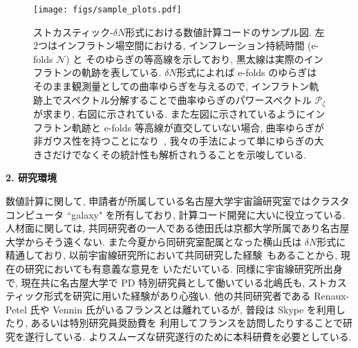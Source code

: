 \documentclass[11pt,a4j,dvipdfmx]{jarticle} 					%
\newcommand{\研究課題名}{\mgfamily\sffamily ストカスティック形式で迫る重力と量子論}
\newcommand{\研究機関名}{\mgfamily\sffamily 名古屋大学}
\newcommand{\研究代表者氏名}{\mgfamily\sffamily 多田祐一郎}
\newcommand{\研究期間の最終元号年度}{34}  %
\begin{document}
\begin{figure}[htbp]
	\centering
	\texttt{[image: figs/sample\_plots.pdf]}
	\caption{ストカスティック-$\delta N$形式における数値計算コードのサンプル図. 左2つはインフラトン場空間における, インフレーション持続時間 (e-folds $\mathcal{N}$) と
	そのゆらぎの等高線を示しており, 黒太線は実際のインフラトンの軌跡を表している. $\delta N$形式によれば e-folds のゆらぎはそのまま観測量としての曲率ゆらぎを与えるので,
	インフラトン軌跡上でスペクトル分解することで曲率ゆらぎのパワースペクトル $\mathcal{P}_\zeta$ が求まり, 右図に示されている.
	また左図に示されているようにインフラトン軌跡と e-folds 等高線が直交していない場合, 曲率ゆらぎが非ガウス性を持つことになり~\cite{Tada:2016pmk}, 
	我々の手法によって単にゆらぎの大きさだけでなくその統計性も解析されうることを示唆している.}
	\label{fig: StocDeltaN}
\end{figure}

\newpage

\begin{mdframed}[roundcorner=0.5zw,
	innertopmargin=0.8zw,innerbottommargin=0.8zw,
	linecolor=black!50,linewidth=0.2zw,
	backgroundcolor=black!10]
	{\bfseries\gtfamily\sffamily\large 2. 研究環境}
\end{mdframed}

数値計算に関して, 申請者が所属している名古屋大学宇宙論研究室ではクラスタコンピュータ ``galaxy" を所有しており, 計算コード開発に大いに役立っている.
人材面に関しては, 共同研究者の一人である徳田氏は京都大学所属であり名古屋大学からそう遠くない. また今夏から同研究室配属となった横山氏は
$\delta N$形式に精通しており, 以前宇宙線研究所において共同研究した経験~\cite{Tada:2015noa}もあることから, 現在の研究においても有意義な意見を
いただいている. 同様に宇宙線研究所出身で, 現在共に名古屋大学で PD 特別研究員として働いている北嶋氏も, ストカスティック形式を研究に用いた経験があり心強い. 
他の共同研究者である Renaux-Petel 氏や Vennin 氏がいるフランスとは離れているが, 普段は Skype を利用したり, あるいは特別研究員奨励費を
利用してフランスを訪問したりすることで研究を遂行している.
よりスムーズな研究遂行のために本科研費を必要としている.
\end{document}
